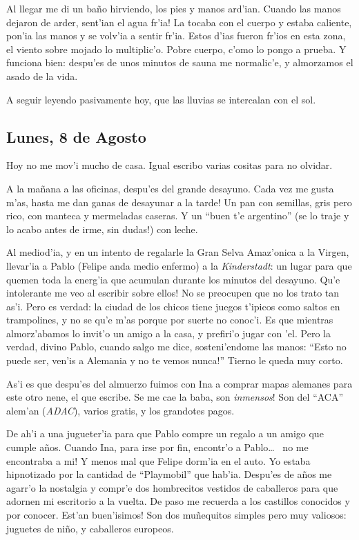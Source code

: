 Al llegar me di un ba\~no hirviendo, los pies y manos ard'ian. Cuando las manos
dejaron de arder, \textexclamdown sent'ian el agua fr'ia! La tocaba con el
cuerpo y estaba caliente, pon'ia las manos y se volv'ia a sentir fr'ia. Estos
d'ias fueron fr'ios en esta zona, el viento sobre mojado lo multiplic'o. Pobre
cuerpo, c'omo lo pongo a prueba. Y funciona bien: despu'es de unos minutos de
sauna me normalic'e, y almorzamos el asado de la vida.

A seguir leyendo pasivamente hoy, que las lluvias se intercalan con el sol.

\subsection*{Lunes, 8 de Agosto}

Hoy no me mov'i mucho de casa. Igual escribo varias cositas para no olvidar.

A la ma\~nana a las oficinas, despu'es del grande desayuno. Cada vez me gusta
m'as, \textexclamdown hasta me dan ganas de desayunar a la tarde! Un pan con
semillas, gris pero rico, con manteca y mermeladas caseras. Y un ``buen t'e
argentino'' (\textexclamdown se lo traje y lo acabo antes de irme, sin dudas!)
con leche.

Al mediod'ia, y en un intento de regalarle la Gran Selva Amaz'onica a la Virgen,
llevar'ia a Pablo (Felipe anda medio enfermo) a la \emph{Kinderstadt}: un lugar
para que quemen toda la energ'ia que acumulan durante los minutos del desayuno.
\textexclamdown Qu'e intolerante me veo al escribir sobre ellos! No se preocupen
que no los trato tan as'i. Pero es verdad: la ciudad de los chicos tiene juegos
t'ipicos como saltos en trampolines, y no se qu'e m'as porque por suerte no
conoc'i. Es que mientras almorz'abamos lo invit'o un amigo a la casa, y
prefiri'o jugar con 'el. Pero la verdad, divino Pablo, cuando salgo me dice,
sosteni'endome las manos: ``Esto no puede ser, \textexclamdown ven'is a Alemania
y no te vemos nunca!'' Tierno le queda muy corto.

As'i es que despu'es del almuerzo fuimos con Ina a comprar mapas alemanes para
este otro nene, el que escribe. Se me cae la baba, \textexclamdown son
\emph{inmensos}! Son del ``{\small ACA}'' alem'an ({\small \emph{ADAC}}), varios
gratis, y los grandotes pagos.

De ah'i a una jugueter'ia para que Pablo compre un regalo a un amigo que cumple
a\~nos. Cuando Ina, para irse por fin, encontr'o a Pablo\ldots\ \textexclamdown
no me encontraba a mi! Y menos mal que Felipe dorm'ia en el auto. Yo estaba
hipnotizado por la cantidad de ``Playmobil'' que hab'ia. Despu'es de a\~nos me
agarr'o la nostalgia y compr'e dos hombrecitos vestidos de caballeros para que
adornen mi escritorio a la vuelta. De paso me recuerda a los castillos conocidos
y por conocer. \textexclamdown Est'an buen'isimos! Son dos mu\~nequitos simples
pero muy valiosos: juguetes de ni\~no, y caballeros europeos.

